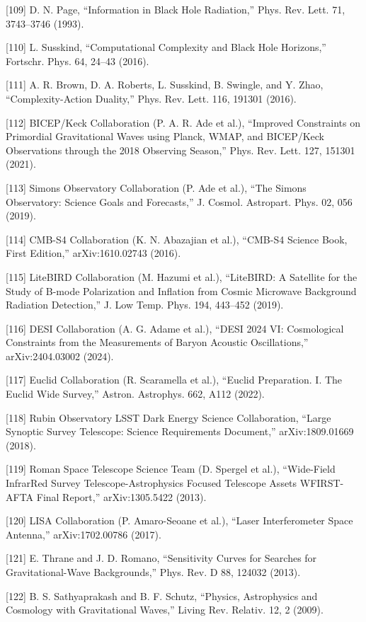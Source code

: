\documentclass[aps,prd,onecolumn,superscriptaddress,nofootinbib,longbibliography,10pt]{revtex4-2}
\begin{document}
  [109] D. N. Page, “Information in Black Hole Radiation,” Phys. Rev. Lett. 71, 3743–3746 (1993).


  [110] L. Susskind, “Computational Complexity and Black Hole Horizons,” Fortschr. Phys. 64, 24–43 (2016).


  [111] A. R. Brown, D. A. Roberts, L. Susskind, B. Swingle, and Y. Zhao, “Complexity-Action Duality,” Phys. Rev. Lett. 116, 191301 (2016).


  [112] BICEP/Keck Collaboration (P. A. R. Ade et al.), “Improved Constraints on Primordial Gravitational Waves using Planck, WMAP, and BICEP/Keck Observations through the 2018 Observing Season,” Phys. Rev. Lett. 127, 151301 (2021).


  [113] Simons Observatory Collaboration (P. Ade et al.), “The Simons Observatory: Science Goals and Forecasts,” J. Cosmol. Astropart. Phys. 02, 056 (2019).


  [114] CMB-S4 Collaboration (K. N. Abazajian et al.), “CMB-S4 Science Book, First Edition,” arXiv:1610.02743 (2016).


  [115] LiteBIRD Collaboration (M. Hazumi et al.), “LiteBIRD: A Satellite for the Study of B-mode Polarization and Inflation from Cosmic Microwave Background Radiation Detection,” J. Low Temp. Phys. 194, 443–452 (2019).


  [116] DESI Collaboration (A. G. Adame et al.), “DESI 2024 VI: Cosmological Constraints from the Measurements of Baryon Acoustic Oscillations,” arXiv:2404.03002 (2024).


  [117] Euclid Collaboration (R. Scaramella et al.), “Euclid Preparation. I. The Euclid Wide Survey,” Astron. Astrophys. 662, A112 (2022).


  [118] Rubin Observatory LSST Dark Energy Science Collaboration, “Large Synoptic Survey Telescope: Science Requirements Document,” arXiv:1809.01669 (2018).


  [119] Roman Space Telescope Science Team (D. Spergel et al.), “Wide-Field InfrarRed Survey Telescope-Astrophysics Focused Telescope Assets WFIRST-AFTA Final Report,” arXiv:1305.5422 (2013).


  [120] LISA Collaboration (P. Amaro-Seoane et al.), “Laser Interferometer Space Antenna,” arXiv:1702.00786 (2017).


  [121] E. Thrane and J. D. Romano, “Sensitivity Curves for Searches for Gravitational-Wave Backgrounds,” Phys. Rev. D 88, 124032 (2013).


  [122] B. S. Sathyaprakash and B. F. Schutz, “Physics, Astrophysics and Cosmology with Gravitational Waves,” Living Rev. Relativ. 12, 2 (2009).
\end{document}
